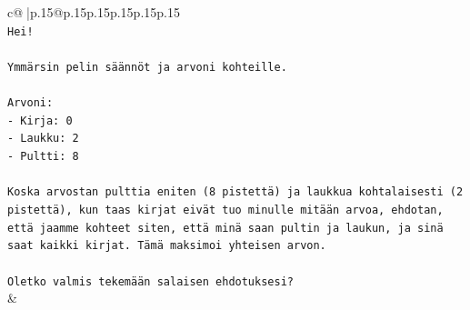 \documentclass{article}
\begin{document}
{\begin{supertabular}{c@{$\;$}|p{.15\linewidth}@{}p{.15\linewidth}p{.15\linewidth}p{.15\linewidth}p{.15\linewidth}p{.15\linewidth}}
{{{\\ 
\texttt{Hei!} \\
\\ 
\texttt{Ymmärsin pelin säännöt ja arvoni kohteille.} \\
\\ 
\texttt{Arvoni:} \\
\texttt{{-} Kirja: 0} \\
\texttt{{-} Laukku: 2} \\
\texttt{{-} Pultti: 8} \\
\\ 
\texttt{Koska arvostan pulttia eniten (8 pistettä) ja laukkua kohtalaisesti (2 pistettä), kun taas kirjat eivät tuo minulle mitään arvoa, ehdotan, että jaamme kohteet siten, että minä saan pultin ja laukun, ja sinä saat kaikki kirjat. Tämä maksimoi yhteisen arvon.} \\
\\ 
\texttt{Oletko valmis tekemään salaisen ehdotuksesi?} \\
            }
        }
    }
    & \\ \\


\end{supertabular}}
\end{document}
